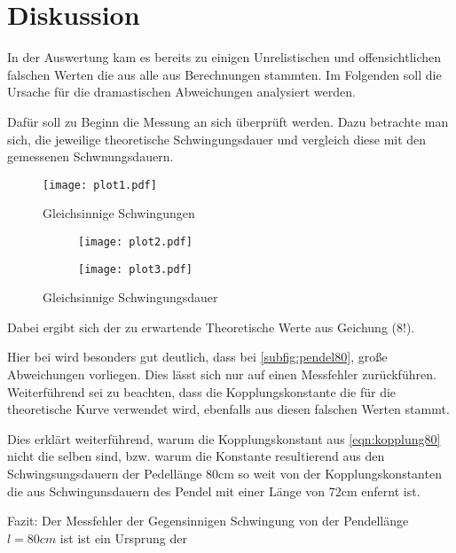\section{Diskussion}
\label{sec:Diskussion}

In der Auswertung kam es bereits zu einigen Unrelistischen und offensichtlichen
falschen Werten die aus alle aus Berechnungen stammten.
Im Folgenden soll die Ursache für die dramastischen Abweichungen analysiert werden.


Dafür soll zu Beginn die Messung an sich überprüft werden.
Dazu betrachte man sich, die jeweilige theoretische Schwingungsdauer und 
vergleich diese mit den gemessenen Schwnungsdauern.
\begin{figure}
    \centering
    \texttt{[image: plot1.pdf]}
    \caption{Gleichsinnige Schwingungen}
\end{figure}

\begin{figure}
    \begin{subfigure}[c]{0.5\textwidth}
        \texttt{[image: plot2.pdf]}
    \end{subfigure}
    \begin{subfigure}[c]{0.5\textwidth}
        \texttt{[image: plot3.pdf]}
        \label{subfig:pedel80}
    \end{subfigure}
    \caption{Gleichsinnige Schwingungsdauer}
\end{figure}

Dabei ergibt sich der zu erwartende Theoretische Werte aus Geichung (8!).

Hier bei wird besonders gut deutlich, dass bei \ref{subfig:pendel80}, große Abweichungen
vorliegen. Dies lässt sich nur auf einen Messfehler zurückführen.
Weiterführend sei zu beachten, dass die Kopplungskonstante die für die theoretische Kurve
verwendet wird, ebenfalls aus diesen falschen Werten stammt.

Dies erklärt weiterführend, warum die Kopplungskonstant aus \ref{eqn:kopplung80} nicht die selben
sind, bzw. warum die Konstante resultierend aus den Schwingsungsdauern der Pedellänge 80cm so weit von der
Kopplungskonstanten die aus Schwingunsdauern des Pendel mit einer Länge von 72cm enfernt ist.

Fazit: Der Messfehler der Gegensinnigen Schwingung von der Pendellänge $l=80cm$ ist 
ist ein Ursprung der 